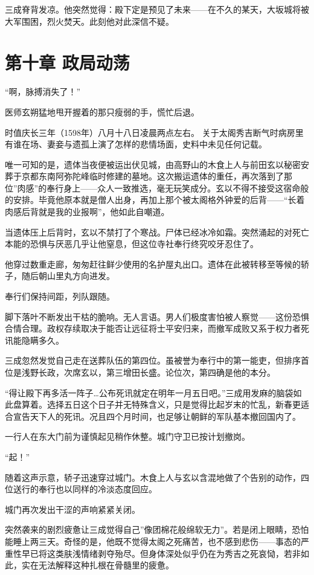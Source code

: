 \documentclass[
]{book}
\begin{document}
三成脊背发凉。他突然觉得：殿下定是预见了未来------在不久的某天，大坂城将被大军围困，烈火焚天。此刻他对此深信不疑。

\chapter*{第十章 政局动荡}\label{ux7b2cux5341ux7ae0-ux653fux5c40ux52a8ux8361}

``啊，脉搏消失了！''

医师玄朔猛地甩开握着的那只瘦弱的手，慌忙后退。

时值庆长三年（1598年）八月十八日凌晨两点左右。 关于太阁秀吉断气时病房里有谁在场、妻妾与遗孤上演了怎样的悲情场面，史料中未见任何记载。

唯一可知的是，遗体当夜便被运出伏见城，由高野山的木食上人与前田玄以秘密安葬于京都东南阿弥陀峰临时修建的墓地。这次搬运遗体的重任，再次落到了那位''肉感''的奉行身上------众人一致推选，毫无玩笑成分。玄以不得不接受这宿命般的安排。毕竟他原本就是僧人出身，再加上那个被太阁格外钟爱的后背------``长着肉感后背就是我的业报啊''，他如此自嘲道。

当遗体压上后背时，玄以不禁打了个寒战。尸体已经冰冷如霜。突然涌起的对死亡本能的恐惧与厌恶几乎让他窒息，但这位寺社奉行终究咬牙忍住了。

他穿过数重走廊，匆匆赶往鲜少使用的名护屋丸出口。遗体在此被转移至等候的轿子，随后朝山里丸方向进发。

奉行们保持间距，列队跟随。

脚下落叶不断发出干枯的脆响。无人言语。男人们极度害怕被人察觉------这份恐惧合情合理。政权存续取决于能否让远征将士平安归来，而撤军成败又系于权力者死讯能隐瞒多久。

三成忽然发觉自己走在送葬队伍的第四位。虽被誉为奉行中的第一能吏，但排序首位是浅野长政，次席玄以，第三增田长盛。论位次，第四确是他的本分。

``得让殿下再多活一阵子\ldots 公布死讯就定在明年一月五日吧。''三成用发麻的脑袋如此盘算着。选择五日这个日子并无特殊含义，只是觉得比起岁末的忙乱，新春更适合宣告天下人的死讯。况且四个月时间，也足够让朝鲜的军队基本撤回国内了。

一行人在东大门前为谨慎起见稍作休整。城门守卫已按计划撤岗。

``起！''

随着这声示意，轿子迅速穿过城门。木食上人与玄以含混地做了个告别的动作，四位送行的奉行也以同样的冷淡态度回应。

城门再次发出干涩的声响紧紧关闭。

突然袭来的剧烈疲惫让三成觉得自己''像团棉花般绵软无力''。若是闭上眼睛，恐怕能睡上两三天。奇怪的是，他既不觉得太阁之死痛苦，也不感到悲伤------事态的严重性早已将这类肤浅情绪剥夺殆尽。但身体深处似乎仍在为秀吉之死哀恸，若非如此，实在无法解释这种扎根在骨髓里的疲惫。
\end{document}

